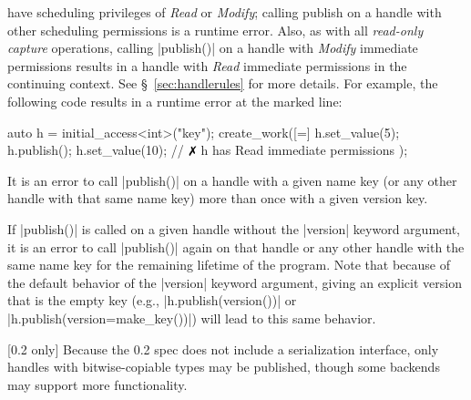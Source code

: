 \begin{compactitem}
  have scheduling privileges of {\it Read} or {\it Modify}; calling publish on a
  handle with other scheduling permissions is a runtime error.  Also, as with
  all {\it read-only capture} operations, calling |publish()| on a
  handle with {\it Modify} immediate permissions results in a handle with {\it
  Read} immediate permissions in the continuing context.  See
  \S~\ref{sec:handlerules} for more details.  For example, the following code
  results in a runtime error at the marked line:
  \begin{CppCode}
  auto h = initial_access<int>("key");
  create_work([=]{
    h.set_value(5);
    h.publish();
    h.set_value(10); // $\no$ h has Read immediate permissions
  });
  \end{CppCode}
  \item It is an error to call |publish()| on a handle with a given
  name key (or any other handle with that same name key) more than once with
  a given version key.
  \item If |publish()| is called on a given handle without the
  |version| keyword argument, it is an error to call |publish()|
  again on that handle or any other handle with the same name key for the
  remaining lifetime of the program.  Note that because of the default behavior
  of the |version| keyword argument, giving an explicit version that is
  the empty key (e.g., |h.publish(version())| or
  |h.publish(version=make_key())|) will lead to this same behavior.
  \item {\color{red} [0.2 only]} Because the 0.2 spec does not include a
  serialization interface, only handles with bitwise-copiable types may be
  published, though some backends may support more functionality.
\end{compactitem}




